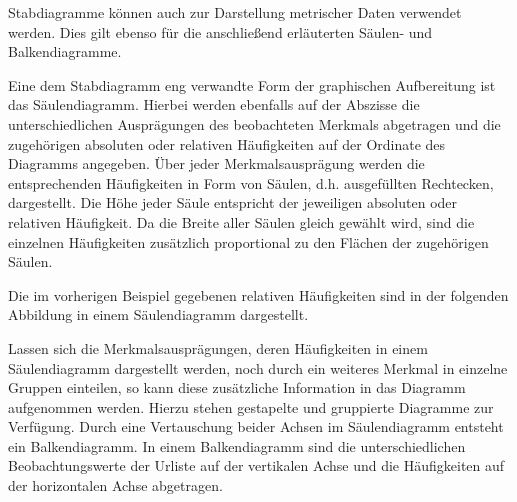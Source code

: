 \documentclass{lecture}
\begin{document}
    Stabdiagramme können auch zur Darstellung metrischer Daten verwendet werden.
    Dies gilt ebenso für die anschließend erläuterten Säulen- und Balkendiagramme.

    Eine dem Stabdiagramm eng verwandte Form der graphischen Aufbereitung ist das Säulendiagramm.
    Hierbei werden ebenfalls auf der Abszisse die unterschiedlichen Ausprägungen des beobachteten Merkmals abgetragen und die zugehörigen absoluten oder relativen Häufigkeiten auf der Ordinate des Diagramms angegeben.
    Über jeder Merkmalsausprägung werden die entsprechenden Häufigkeiten in Form von Säulen, d.h. ausgefüllten Rechtecken, dargestellt.
    Die Höhe jeder Säule entspricht der jeweiligen absoluten oder relativen Häufigkeit.
    Da die Breite aller Säulen gleich gewählt wird, sind die einzelnen Häufigkeiten zusätzlich proportional zu den Flächen der zugehörigen Säulen.

    \begin{example}
        Die im vorherigen Beispiel gegebenen relativen Häufigkeiten sind in der folgenden Abbildung in einem Säulendiagramm dargestellt.
        \begin{center}
        \end{center}
    \end{example}

    Lassen sich die Merkmalsausprägungen, deren Häufigkeiten in einem Säulendiagramm dargestellt werden, noch durch ein weiteres Merkmal in einzelne Gruppen einteilen, so kann diese zusätzliche Information in das Diagramm aufgenommen werden.
    Hierzu stehen gestapelte und gruppierte Diagramme zur Verfügung.
    Durch eine Vertauschung beider Achsen im Säulendiagramm entsteht ein Balkendiagramm.
    In einem Balkendiagramm sind die unterschiedlichen Beobachtungswerte der Urliste auf der vertikalen Achse und die Häufigkeiten auf der horizontalen Achse abgetragen.
\end{document}

